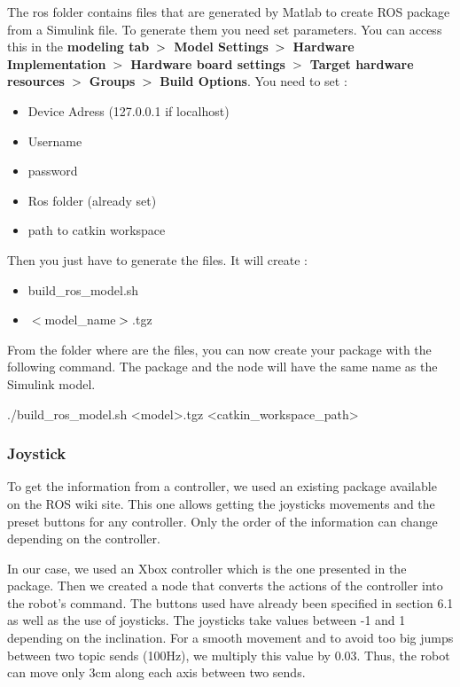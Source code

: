 \bigbreak
The ros folder contains files that are generated by Matlab to create ROS package from a Simulink file. To generate them you need set parameters. You can access this in the \textbf{modeling tab} $\bg$ \textbf{Model Settings} $\bg$ \textbf{Hardware Implementation} $\bg$ \textbf{Hardware board settings} $\bg$ \textbf{Target hardware resources} $\bg$ \textbf{Groups} $\bg$ \textbf{Build Options}. You need to set :
\begin{itemize}[noitemsep]
    \item Device Adress (127.0.0.1 if localhost)
    \item Username
    \item password
    \item Ros folder (already set)
    \item path to catkin workspace
\end{itemize}

\bigbreak
Then you just have to generate the files. It will create :
\begin{multicols}{2}
    \begin{itemize}[noitemsep]
        \item build\_ros\_model.sh
        \item $\less$model\_name$\bg$.tgz
    \end{itemize}
\end{multicols}


\bigbreak
From the folder where are the files, you can now create your package with the following command. The package and the node will have the same name as the Simulink model.
\begin{commandshell}
    ./build_ros_model.sh <model>.tgz <catkin_workspace_path>
\end{commandshell} 


\subsubsection{Joystick}

To get the information from a controller, we used an existing package available on the ROS wiki site. This one allows getting the joysticks movements and the preset buttons for any controller. Only the order of the information can change depending on the controller. 

\bigbreak
In our case, we used an Xbox controller which is the one presented in the package. Then we created a node that converts the actions of the controller into the robot's command. The buttons used have already been specified in section 6.1 as well as the use of joysticks. The joysticks take values between -1 and 1 depending on the inclination. For a smooth movement and to avoid too big jumps between two topic sends (100Hz), we multiply this value by 0.03. Thus, the robot can move only 3cm along each axis between two sends.

